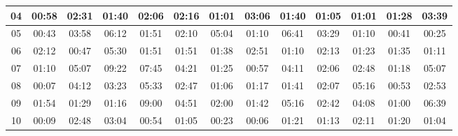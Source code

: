 \begin{center}
\begin{sideways}
\begin{tabular}{|l|l|l|l|l|l|l|l|l|l|l|l|l|}
\hline
\multicolumn{1}{|c|}{04} & \multicolumn{1}{c|}{00:58} & \multicolumn{1}{c|}{02:31} & \multicolumn{1}{c|}{01:40} & \multicolumn{1}{c|}{02:06} & \multicolumn{1}{c|}{02:16} & \multicolumn{1}{c|}{01:01} & \multicolumn{1}{c|}{03:06} & \multicolumn{1}{c|}{01:40} & \multicolumn{1}{c|}{01:05} & \multicolumn{1}{c|}{01:01} & \multicolumn{1}{c|}{01:28} & \multicolumn{1}{c|}{03:39} \\ 
\hline
\multicolumn{1}{|c|}{05} & \multicolumn{1}{c|}{00:43} & \multicolumn{1}{c|}{03:58} & \multicolumn{1}{c|}{06:12} & \multicolumn{1}{c|}{01:51} & \multicolumn{1}{c|}{02:10} & \multicolumn{1}{c|}{05:04} & \multicolumn{1}{c|}{01:10} & \multicolumn{1}{c|}{06:41} & \multicolumn{1}{c|}{03:29} & \multicolumn{1}{c|}{01:10} & \multicolumn{1}{c|}{00:41} & \multicolumn{1}{c|}{00:25} \\ 
\hline
\multicolumn{1}{|c|}{06} & \multicolumn{1}{c|}{02:12} & \multicolumn{1}{c|}{00:47} & \multicolumn{1}{c|}{05:30} & \multicolumn{1}{c|}{01:51} & \multicolumn{1}{c|}{01:51} & \multicolumn{1}{c|}{01:38} & \multicolumn{1}{c|}{02:51} & \multicolumn{1}{c|}{01:10} & \multicolumn{1}{c|}{02:13} & \multicolumn{1}{c|}{01:23} & \multicolumn{1}{c|}{01:35} & \multicolumn{1}{c|}{01:11} \\ 
\hline
\multicolumn{1}{|c|}{07} & \multicolumn{1}{c|}{01:10} & \multicolumn{1}{c|}{05:07} & \multicolumn{1}{c|}{09:22} & \multicolumn{1}{c|}{07:45} & \multicolumn{1}{c|}{04:21} & \multicolumn{1}{c|}{01:25} & \multicolumn{1}{c|}{00:57} & \multicolumn{1}{c|}{04:11} & \multicolumn{1}{c|}{02:06} & \multicolumn{1}{c|}{02:48} & \multicolumn{1}{c|}{01:18} & \multicolumn{1}{c|}{05:07} \\ 
\hline
\multicolumn{1}{|c|}{08} & \multicolumn{1}{c|}{00:07} & \multicolumn{1}{c|}{04:12} & \multicolumn{1}{c|}{03:23} & \multicolumn{1}{c|}{05:33} & \multicolumn{1}{c|}{02:47} & \multicolumn{1}{c|}{01:06} & \multicolumn{1}{c|}{01:17} & \multicolumn{1}{c|}{01:41} & \multicolumn{1}{c|}{02:07} & \multicolumn{1}{c|}{05:16} & \multicolumn{1}{c|}{00:53} & \multicolumn{1}{c|}{02:53} \\ 
\hline
\multicolumn{1}{|c|}{09} & \multicolumn{1}{c|}{01:54} & \multicolumn{1}{c|}{01:29} & \multicolumn{1}{c|}{01:16} & \multicolumn{1}{c|}{09:00} & \multicolumn{1}{c|}{04:51} & \multicolumn{1}{c|}{02:00} & \multicolumn{1}{c|}{01:42} & \multicolumn{1}{c|}{05:16} & \multicolumn{1}{c|}{02:42} & \multicolumn{1}{c|}{04:08} & \multicolumn{1}{c|}{01:00} & \multicolumn{1}{c|}{06:39} \\ 
\hline
\multicolumn{1}{|c|}{10} & \multicolumn{1}{c|}{00:09} & \multicolumn{1}{c|}{02:48} & \multicolumn{1}{c|}{03:04} & \multicolumn{1}{c|}{00:54} & \multicolumn{1}{c|}{01:05} & \multicolumn{1}{c|}{00:23} & \multicolumn{1}{c|}{00:06} & \multicolumn{1}{c|}{01:21} & \multicolumn{1}{c|}{01:13} & \multicolumn{1}{c|}{02:11} & \multicolumn{1}{c|}{01:20} & \multicolumn{1}{c|}{01:04} \\ 

\end{tabular}
\end{sideways}
\end{center}
